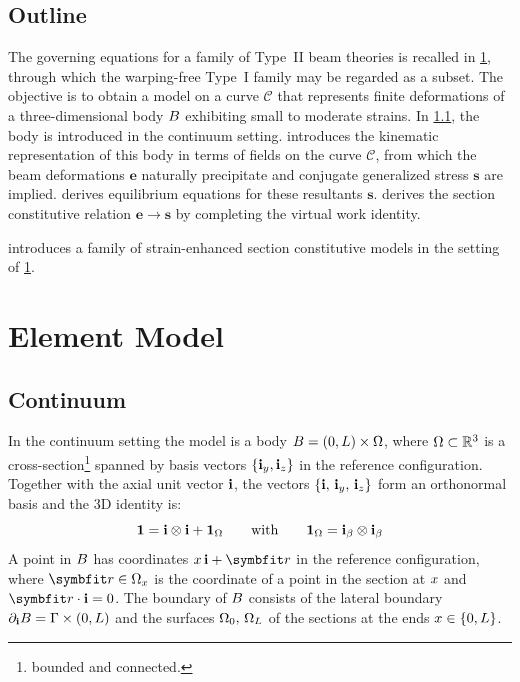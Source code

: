 


\subsection{Outline}

The governing equations for a family of Type~II beam theories is recalled in \cref{sec:genwarp}, through which the warping-free Type~I family may be regarded as a subset. 
The objective is to obtain a model on a curve \(\mathcal{C}\) that represents finite deformations of a three-dimensional body \(B\) exhibiting small to moderate strains.
In \cref{sec:std-continuum}, the body is introduced in the continuum setting.  introduces the kinematic representation of this body in terms of fields on the curve \(\mathcal{C}\), from which the beam deformations \(\bm{e}\) naturally precipitate and conjugate generalized stress \(\bm{s}\) are implied.  derives equilibrium equations for these resultants \(\bm{s}\). 
 derives the section constitutive relation \(\bm{e}\rightarrow\bm{s}\) by completing the virtual work identity.

 introduces a family of strain-enhanced section constitutive models in the setting of \cref{sec:genwarp}. 

\section{Element Model}\label{sec:genwarp}

\subsection{Continuum}\label{sec:std-continuum}
In the continuum setting the model is a body
\(
B=(0,L)\times\Omega
\),
where \(\Omega\subset\mathbb{R}^3\) is a cross-section\footnote{bounded and connected.}
spanned by basis vectors \(\{\mathbf{i}_y,\mathbf{i}_z\}\) in the reference configuration.%
Together with the axial unit vector \(\mathbf{i}\), the vectors \(\{\mathbf{i},\,\mathbf{i}_y,\,\mathbf{i}_z\}\) form an orthonormal basis and the 3D identity is:
\[
\mathbf{1}=\mathbf{i}\otimes\mathbf{i}+\mathbf{1}_\Omega
\qquad\text{with}\qquad
\mathbf{1}_\Omega=\mathbf{i}_{\beta}\otimes\mathbf{i}_{\beta}
\]
A point in \(B\) has coordinates \(\reflenx\,\FrameBasis + \bm{r}\) in the reference configuration, where \(\bm{r} \in\Section_x\) is the coordinate of a point in the section at \(x\) and \(\bm{r}\cdot\FrameBasis = 0\).
The boundary of \(B\) consists of the lateral boundary \(\partial_{\mathbf{i}}B=\Gamma\times(0,L)\) and the surfaces \(\Omega_0,\,\Omega_L\) of the sections at the ends \(x \in \{0,L\}\).  

